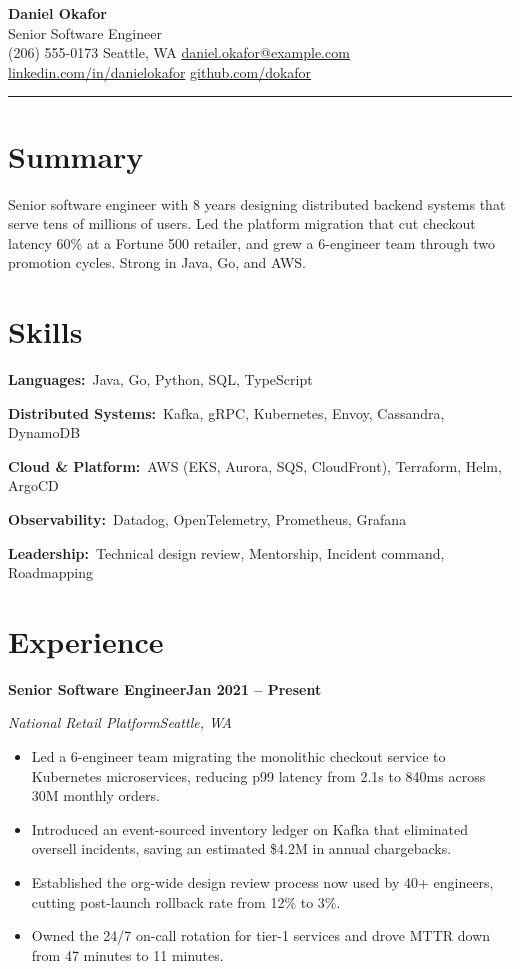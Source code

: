 \documentclass[letterpaper,10pt]{article}
\makeatletter
\newcommand{\csep}{\hspace{5pt}\textbar\hspace{5pt}}
\newcommand{\rRole}[4]{%
  \vspace{3pt}%
  \noindent\textbf{#1}\hfill\textbf{#4}\par
  \noindent\textit{\color{muted}#2}\hfill\textit{\color{muted}#3}\par
  \vspace{1pt}%
}
\newcommand{\rSkill}[2]{\noindent\textbf{#1:}\ #2\par\vspace{2pt}}
\newenvironment{rBullets}
  {\begin{itemize}[leftmargin=13pt,itemsep=2pt,parsep=0pt,topsep=2pt,
                   partopsep=0pt,label=\textbullet]}
  {\end{itemize}}
\def\name{Daniel Okafor}
\def\role{Senior Software Engineer}
\def\phone{(206) 555-0173}
\def\location{Seattle, WA}
\def\email{daniel.okafor@example.com}
\def\LinkedIn{danielokafor}
\def\github{dokafor}
\makeatother
\begin{document}
\begin{center}
  {\LARGE\bfseries\color{bodytext}\name}\\[3pt]
  {\large\color{accent}\role}\\[5pt]
  {\small
    \phone\csep
    \location\csep
    \href{mailto:\email}{\email}\csep
    \href{https://linkedin.com/in/\LinkedIn}{linkedin.com/in/\LinkedIn}\csep
    \href{https://github.com/\github}{github.com/\github}}
\end{center}
\vspace{3pt}
{\color{accent}\rule{\linewidth}{1.2pt}}

\section{Summary}
Senior software engineer with 8 years designing distributed backend systems that
serve tens of millions of users. Led the platform migration that cut checkout
latency 60\% at a Fortune 500 retailer, and grew a 6-engineer team through two
promotion cycles. Strong in Java, Go, and AWS.

\section{Skills}
\rSkill{Languages}{Java, Go, Python, SQL, TypeScript}
\rSkill{Distributed Systems}{Kafka, gRPC, Kubernetes, Envoy, Cassandra, DynamoDB}
\rSkill{Cloud \& Platform}{AWS (EKS, Aurora, SQS, CloudFront), Terraform, Helm, ArgoCD}
\rSkill{Observability}{Datadog, OpenTelemetry, Prometheus, Grafana}
\rSkill{Leadership}{Technical design review, Mentorship, Incident command, Roadmapping}

\section{Experience}

\rRole{Senior Software Engineer}{National Retail Platform}{Seattle, WA}{Jan 2021 -- Present}
\begin{rBullets}
  \item Led a 6-engineer team migrating the monolithic checkout service to Kubernetes microservices, reducing p99 latency from 2.1s to 840ms across 30M monthly orders.
  \item Introduced an event-sourced inventory ledger on Kafka that eliminated oversell incidents, saving an estimated \$4.2M in annual chargebacks.
  \item Established the org-wide design review process now used by 40+ engineers, cutting post-launch rollback rate from 12\% to 3\%.
  \item Owned the 24/7 on-call rotation for tier-1 services and drove MTTR down from 47 minutes to 11 minutes.
\end{rBullets}
\end{document}
